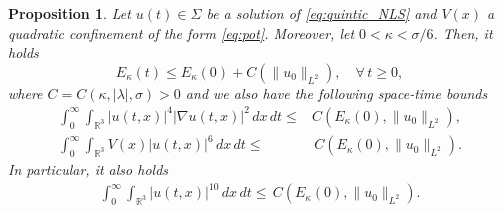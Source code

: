\documentclass[a4paper,leqno]{amsart}
\theoremstyle{plain}
\newtheorem{proposition}[theorem]{Proposition}
\theoremstyle{definition}
\numberwithin{equation}{section}
\begin{document}
\begin{proposition}  \label{prop:a-priori}
Let $u(t) \in \Sigma$ be a solution of \eqref{eq:quintic_NLS} and $V(x)$ a quadratic confinement of the form \eqref{eq:pot}. 
Moreover, let $0 < \kappa<\sigma / 6$. Then, it holds
\begin{equation*}
E_\kappa(t){\leqslant} E_\kappa(0)+C (\|u_0\|_{L^2}), \quad \forall \, t{\geqslant} 0,
\end{equation*}
where $C= C(\kappa, |\lambda|, \sigma)>0$ and we also have the following space-time bounds
\begin{align*}
\int_0^\infty\int_{{{\mathbb R}}^3}|u(t, x)|^4|\nabla u(t,x)|^2\, d x  \, d t{\leqslant} & C(E_\kappa(0), \|u_0\|_{L^2}),\\
\int_0^\infty\int_{{{\mathbb R}}^3}V(x)|u(t, x)|^6\, d x\, d t{\leqslant} & \, C(E_\kappa(0), \|u_0\|_{L^2}).
\end{align*}
In particular, it also holds
\begin{align*}
\int_0^\infty\int_{{{\mathbb R}}^3}|u(t,x)|^{10}\, d x\,  d t{\leqslant}  \, C(E_\kappa(0), \|u_0\|_{L^2}).
\end{align*}
\end{proposition}
\end{document}
